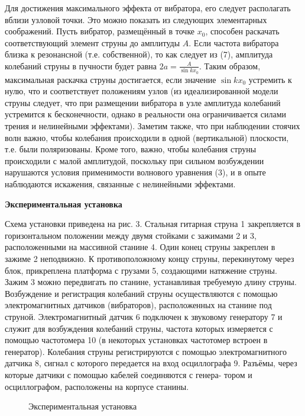 \documentclass[14pt]{article}
\begin{document}
Для достижения максимального эффекта от вибратора, его следует располагать вблизи узловой точки. Это можно показать из следующих элементарных соображений. Пусть вибратор, размещённый в точке $x_0$, способен раскачать соответствующий элемент струны до амплитуды $A$. Если частота вибратора близка к резонансной (т.е. собственной), то как следует из (7), амплитуда колебаний струны в пучности будет равна 
$2a = \frac{A}{\sin kx_0}$. Таким образом, максимальная раскачка струны достигается, если значение $\sin kx_0$ устремить к нулю, что и соответствует положениям узлов (из идеализированной модели струны следует, что при размещении вибратора в узле амплитуда колебаний устремится к бесконечности, однако в реальности она ограничивается силами трения и нелинейными эффектами). Заметим также, что при наблюдении стоячих волн важно, чтобы колебания происходили в одной (вертикальной) плоскости, т.е. были поляризованы. Кроме того, важно, чтобы колебания струны происходили с малой амплитудой, поскольку при сильном возбуждении нарушаются условия применимости волнового уравнения (3), и в опыте наблюдаются искажения, связанные с нелинейными эффектами. 

\vspace{1cm}
\textbf{Экспериментальная установка}

Схема установки приведена на рис. 3. Стальная гитарная струна 1 закрепляется в горизонтальном положении между двумя стойками с зажимами 2 и 3, расположенными на массивной станине 4. Один конец струны закреплен в зажиме 2 неподвижно. К противоположному концу струны, перекинутому через блок, прикреплена платформа с грузами 5, создающими натяжение струны. Зажим 3 можно передвигать по станине, устанавливая требуемую длину струны. Возбуждение и регистрация колебаний струны осуществляются с помощью электромагнитных датчиков (вибраторов), расположенных на станине под струной. Электромагнитный датчик 6 подключен к звуковому генератору 7 и служит для возбуждения колебаний струны, частота которых измеряется с помощью частотомера 10 (в некоторых установках частотомер встроен в генератор). Колебания струны регистрируются с помощью электромагнитного датчика 8, сигнал с которого передается на вход осциллографа 9. Разъёмы, через которые датчики с помощью кабелей соединяются с генера-
тором и осциллографом, расположены на корпусе станины.

\begin{figure}[h!]
	\caption{Экспериментальная установка}
	\label{fig:image}
\end{figure}
\end{document}
